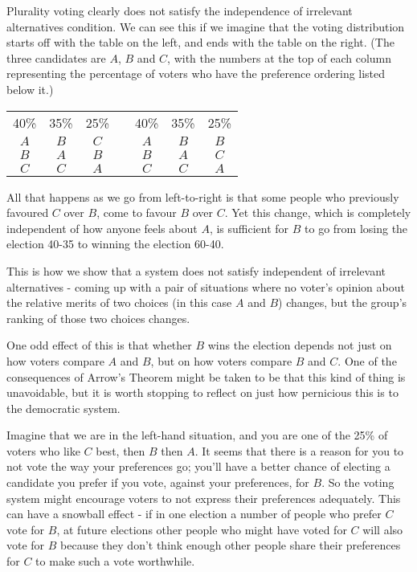 \begin{multicols}{2}
Plurality voting clearly does not satisfy the independence of irrelevant alternatives condition. We can see this if we imagine that the voting distribution starts off with the table on the left, and ends with the table on the right. (The three candidates are $A$, $B$ and $C$, with the numbers at the top of each column representing the percentage of voters who have the preference ordering listed below it.)

\begin{center}
\begin{tabular}{c c c p{100pt} c c c}
40\% & 35\% & 25\% & & 40\% & 35\% & 25\% \\
\cmidrule(r){1-3}
\cmidrule(r){5-7}
$A$ & $B$ & $C$ & & $A$ & $B$ & $B$ \\
$B$ & $A$ & $B$ & & $B$ & $A$ & $C$ \\
$C$ & $C$ & $A$ & & $C$ & $C$ & $A$
\end{tabular}
\end{center}
All that happens as we go from left-to-right is that some people who previously favoured $C$ over $B$, come to favour $B$ over $C$. Yet this change, which is completely independent of how anyone feels about $A$, is sufficient for $B$ to go from losing the election 40-35 to winning the election 60-40.

This is how we show that a system does not satisfy independent of irrelevant alternatives - coming up with a pair of situations where no voter's opinion about the relative merits of two choices (in this case $A$ and $B$) changes, but the group's ranking of those two choices changes.

One odd effect of this is that whether $B$ wins the election depends not just on how voters compare $A$ and $B$, but on how voters compare $B$ and $C$. One of the consequences of Arrow's Theorem might be taken to be that this kind of thing is unavoidable, but it is worth stopping to reflect on just how pernicious this is to the democratic system. 

Imagine that we are in the left-hand situation, and you are one of the 25\% of voters who like $C$ best, then $B$ then $A$. It seems that there is a reason for you to not vote the way your preferences go; you'll have a better chance of electing a candidate you prefer if you vote, against your preferences, for $B$. So the voting system might encourage voters to not express their preferences adequately. This can have a snowball effect - if in one election a number of people who prefer $C$ vote for $B$, at future elections other people who might have voted for $C$ will also vote for $B$ because they don't think enough other people share their preferences for $C$ to make such a vote worthwhile.


\end{multicols}
